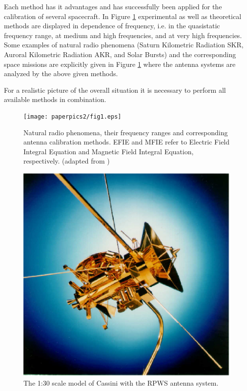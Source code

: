 \documentclass[a4paper,twocolumn]{esapub2005} %
\begin{document}
Each method has it advantages and has successfully been applied for the calibration of several spacecraft. In Figure \ref{fig1} experimental as well as theoretical methods are displayed in dependence of frequency, i.e. in the quasistatic frequency range, at medium and high frequencies, and at very high frequencies. Some examples of natural radio phenomena (Saturn Kilometric Radiation SKR, Auroral Kilometric Radiation AKR, and Solar Bursts) and the corresponding space missions are explicitly given in Figure \ref{fig1} where the antenna systems are analyzed by the above given methods.

For a realistic picture of the overall situation it is necessary to perform all available methods in combination.

\begin{figure}
\centering
  \texttt{[image: paperpics2/fig1.eps]}
\caption{Natural radio phenomena, their frequency ranges and corresponding antenna calibration methods. EFIE and MFIE refer to Electric Field Integral Equation and Magnetic Field Integral Equation, respectively. (adapted from \cite{ruckerundi05}) \label{fig1}}
\end{figure}

\begin{figure}
\centering
  \includegraphics[width=0.8\linewidth]{paperpics2/fig1b.eps}
\caption{The 1:30 scale model of Cassini with the RPWS antenna system.\label{fig1b}}
\end{figure}
\end{document}
